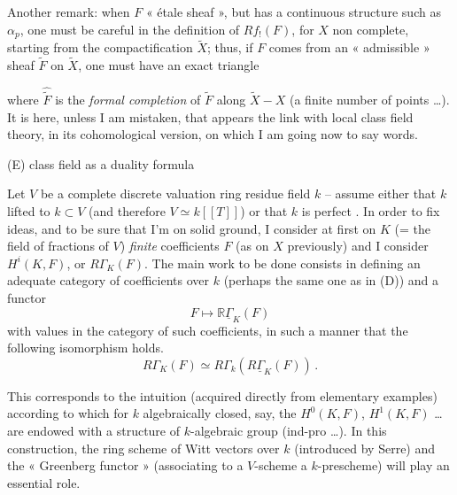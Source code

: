 \documentclass[11pt,a4paper]{article}
\begin{document}
Another remark: when $F$   « étale sheaf », but has a continuous structure such as $\alpha_p$, one must be careful in the definition of $Rf_!(F)$, for $X$ non complete, starting from the compactification $\tilde{X}$; thus, if $F$ comes from an « admissible » sheaf $\tilde{F}$ on $\tilde{X}$, one must have an exact triangle



where $\hat{\tilde{F}}$ is the \emph{formal completion} of $\tilde{F}$ along $\tilde{X} - X$ (a finite number of points …). It is here, unless I am mistaken, that appears the link with local class field theory, in its cohomological version, on which I am going now to say   words.

(E)   class field  as a duality formula

Let $V$ be a complete discrete valuation ring  residue field $k$ -- assume either that $k$   lifted to $k \subset V$ (and therefore $V \simeq k[[T]]$) or that $k$ is perfect . In order to fix ideas, and to be sure that I'm on solid ground, I consider at first on $K$ (= the field of fractions of $V$) \emph{finite} coefficients $F$ (as on $X$ previously) and I consider  $H^i(K, F)$, or $R\Gamma_K(F)$. The main work to be done consists in defining an adequate category of coefficients over $k$ (perhaps the same one as in (D)) and a functor
\[
F \longmapsto \mathbb{R}\underline{\Gamma}_K(F)
\]
with values in the category of such coefficients, in such a manner that the following isomorphism holds.
\[
R\Gamma_K(F) \simeq R\Gamma_k(R\underline{\Gamma}_K(F)) \,.
\]

This corresponds to the intuition (acquired directly from elementary examples) according to which for $k$ algebraically closed, say, the $H^0(K, F)$, $H^1(K, F)$ … are endowed with a structure of $k$-algebraic group (ind-pro …). In this construction, the ring scheme of Witt vectors over $k$ (introduced by Serre) and the « Greenberg functor » (associating to a $V$-scheme a $k$-prescheme) will play an essential role.
\end{document}
